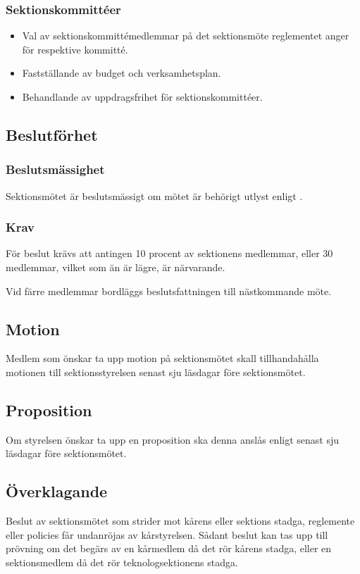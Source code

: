 \subsubsection{Sektionskommittéer}
\begin{itemize}
	\item Val av sektionskommittémedlemmar på det sektionsmöte reglementet anger för respektive kommitté. 
	\item Fastställande av budget och verksamhetsplan.
	\item Behandlande av uppdragsfrihet för sektionskommittéer.
\end{itemize}

\subsection{Beslutförhet}

\subsubsection{Beslutsmässighet}
Sektionsmötet är beslutsmässigt om mötet är behörigt utlyst enligt .

\subsubsection{Krav}
För beslut krävs att antingen 10 procent av sektionens medlemmar, eller 30 medlemmar, vilket som än är lägre, är närvarande.

Vid färre medlemmar bordläggs beslutsfattningen till nästkommande möte.

\subsection{Motion}
Medlem som önskar ta upp motion på sektionsmötet skall tillhandahålla motionen till sektionsstyrelsen senast sju läsdagar före sektionsmötet.


\subsection{Proposition}
Om styrelsen önskar ta upp en proposition ska denna anslås enligt  senast sju läsdagar före sektionsmötet.  


\subsection{Överklagande}
Beslut av sektionsmötet som strider mot kårens eller sektions stadga, reglemente eller policies får undanröjas av kårstyrelsen. Sådant beslut kan tas upp till prövning om det begärs av en kårmedlem då det rör kårens stadga, eller en sektionsmedlem då det rör teknologsektionens stadga.

